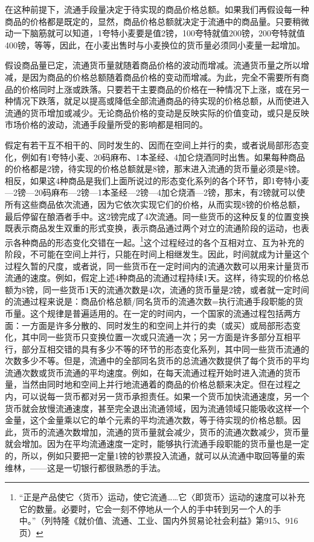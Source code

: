 \documentclass{ctexbook}
\begin{document}
        在这种前提下，流通手段量决定于待实现的商品价格总额。如果我们再假设每一种商品的价格都是既定的，显然，商品价格总额就决定于流通中的商品量。只要稍微动一下脑筋就可以知道，1夸特小麦要是值2镑，100夸特就值200镑，200夸特就值400镑，等等，因此，在小麦出售时与小麦换位的货币量必须同小麦量一起增加。
        
        假设商品量已定，流通货币量就随着商品价格的波动而增减。流通货币量之所以增减，是因为商品的价格总额随着商品价格的变动而增减。为此，完全不需要所有商品的价格同时上涨或跌落。只要若干主要商品的价格在一种情况下上涨，或在另一种情况下跌落，就足以提高或降低全部流通商品的待实现的价格总额，从而使进入流通的货币增加或减少。无论商品价格的变动是反映实际的价值变动，或只是反映市场价格的波动，流通手段量所受的影响都是相同的。
        
        假定有若干互不相干的、同时发生的、因而在空间上并行的卖，或者说局部形态变化，例如有1夸特小麦、20码麻布、1本圣经、4加仑烧酒同时出售。如果每种商品的价格都是2镑，待实现的价格总额就是8镑，那末进入流通的货币量必须是8镑。相反，如果这4种商品是我们上面所说过的形态变化系列的各个环节，即1夸特小麦—2镑—20码麻布—2镑—1本圣经—2镑—4加仑烧酒—2镑，那末，有2镑就可以使所有这些商品依次流通，因为它依次实现它们的价格，从而实现8镑的价格总额，最后停留在酿酒者手中。这2镑完成了4次流通。同一些货币的这种反复的位置变换既表示商品发生双重的形式变换，表示商品通过两个对立的流通阶段的运动，也表示各种商品的形态变化交错在一起。\footnote{“正是产品使它〈货币〉运动，使它流通……它〈即货币〉运动的速度可以补充它的数量。必要时，它会一刻不停地从一个人的手中转到另一个人的手中。”（列特隆《就价值、流通、工业、国内外贸易论社会利益》第915、916页）}这个过程经过的各个互相对立、互为补充的阶段，不可能在空间上并行，只能在时间上相继发生。因此，时间就成为计量这个过程久暂的尺度，或者说，同一些货币在一定时间内的流通次数可以用来计量货币流通的速度。例如，假定上述4种商品的流通过程持续1天。这样，待实现的价格总额为8镑，同一些货币1天的流通次数是4次，流通的货币量是2镑，或者就一定时间的流通过程来说是：商品价格总额/同名货币的流通次数=执行流通手段职能的货币量。这个规律是普遍适用的。在一定的时间内，一个国家的流通过程包括两方面：一方面是许多分散的、同时发生的和空间上并行的卖（或买）或局部形态变化，其中同一些货币只变换位置一次或只流通一次；另一方面是许多部分互相平行，部分互相交错的具有多少不等的环节的形态变化系列，其中同一些货币流通的次数多少不等。但是，流通中的全部同名货币的总流通次数提供了每个货币的平均流通次数或货币流通的平均速度。例如，在每天流通过程开始时进入流通的货币量，当然由同时地和空间上并行地流通着的商品的价格总额来决定。但在过程之内，可以说每一货币都对另一货币承担责任。如果一个货币加快流通速度，另一个货币就会放慢流通速度，甚至完全退出流通领域，因为流通领域只能吸收这样一个金量，这个金量乘以它的单个元素的平均流通次数，等于待实现的价格总额。因此，货币的流通次数增加，流通的货币量就会减少，货币的流通次数减少，货币量就会增加。因为在平均流通速度一定时，能够执行流通手段职能的货币量也是一定的，所以，例如只要把一定量1镑的钞票投入流通，就可以从流通中取回等量的索维林，——这是一切银行都很熟悉的手法。
        
\end{document}
